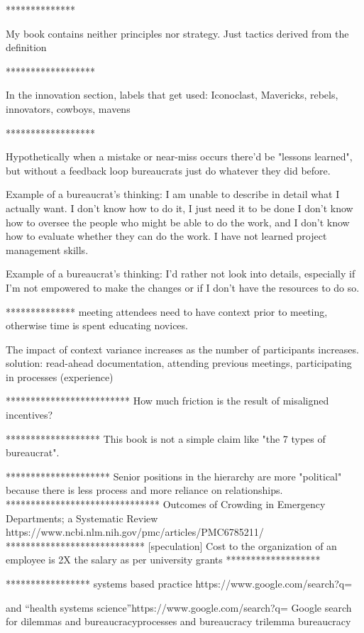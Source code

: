**************

My book contains neither principles nor strategy. Just tactics derived from the definition

******************

In the innovation section, labels that get used:
Iconoclast, Mavericks, rebels, innovators, cowboys, mavens

******************

Hypothetically when a mistake or near-miss occurs there'd be "lessons learned", but without a feedback loop bureaucrats just do whatever they did before. 

Example of a bureaucrat's thinking:
I am unable to describe in detail what I actually want. I don't know how to do it, I just need it to be done I don't know how to oversee the people who might be able to do the work, and I don't know how to evaluate whether they can do the work. I have not learned project management skills.

Example of a bureaucrat's thinking:
I'd rather not look into details, especially if I'm not empowered to make the changes or if I don't have the resources to do so.

**************
meeting attendees need to have context prior to meeting, otherwise time is spent educating novices. 

The impact of context variance increases as the number of participants increases. solution: read-ahead documentation, attending previous meetings, participating in processes (experience)

*************************
How much friction is the result of misaligned incentives?

*******************
This book is not a simple claim like "the 7 types of bureaucrat". 

*********************
Senior positions in the hierarchy are more "political" because there is less process and more reliance on relationships.
*******************************
Outcomes of Crowding in Emergency Departments; a Systematic Review
https://www.ncbi.nlm.nih.gov/pmc/articles/PMC6785211/ 
****************************
[speculation] Cost to the organization of an employee is 2X the salary as per university grants
*******************

*****************
systems based practice 
https://www.google.com/search?q=%

and “health systems science”https://www.google.com/search?q=%
Google search for dilemmas and bureaucracyprocesses and bureaucracy
trilemma bureaucracy

